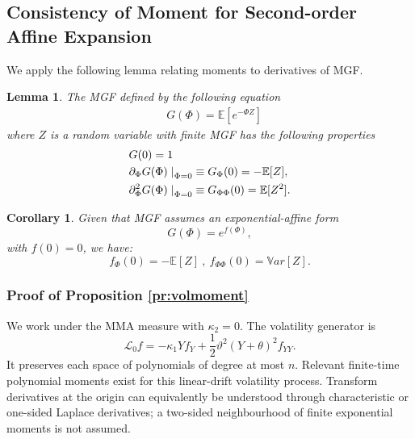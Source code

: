 \documentclass[11pt,a4paper] {article}
\newtheorem{corollary}{Corollary}[section]
\newtheorem{lemma}{Lemma}[section]
\begin{document}
\subsection{Consistency of Moment for Second-order Affine Expansion}

We apply the following lemma relating moments to derivatives of MGF. 
\begin{lemma} \label {lemma:g}
The MGF defined by the following equation
\begin{equation} \label {eq:mmg1}
\begin{split}
& G(\Phi) = \mathbb{E}[e^{-\Phi Z }]
\end{split}
\end{equation}
where $Z$ is a random variable with finite MGF has the following properties
  \begin{equation} \label {eq:mmg2}
\begin{split}
& G(0) = 1\\
& \partial_{\Phi} G(\Phi) \left.\right|_{\Phi=0} \equiv G_{\Phi}(0)= -\mathbb{E}[Z],\\
& \partial^{2}_{\Phi} G(\Phi) \left.\right|_{\Phi=0} \equiv  G_{\Phi\Phi}(0)= \mathbb{E}[Z^{2}].\vspace*{-1.0\baselineskip}
\end{split}
\end{equation}
\end{lemma}

\begin{corollary}
Given that MGF assumes an exponential-affine form
\begin{equation} \label {eq:mmg3}
G(\Phi) = e^{f(\Phi)},
\end{equation}
with $f(0)=0$, we have:
\begin{equation} \label {eq:mmg4}
f_{\Phi}(0)= -\mathbb{E}[Z] \ , \  f_{\Phi\Phi}(0)= \mathbb{V}ar[Z].
\end{equation}
\end{corollary}


\subsubsection{Proof of Proposition \ref{pr:volmoment}}\label{app:volmoment}

We work under the MMA measure with $\kappa_2=0$. The volatility generator is
\begin{equation*}
\mathcal L_0 f=-\kappa_1Yf_Y+\frac12\vartheta^2(Y+\theta)^2f_{YY}.
\end{equation*}
It preserves each space of polynomials of degree at most $n$. Relevant
finite-time polynomial moments exist for this linear-drift volatility process.
Transform derivatives at the origin can equivalently be understood through
characteristic or one-sided Laplace derivatives; a two-sided neighbourhood of
finite exponential moments is not assumed.
\end{document}
